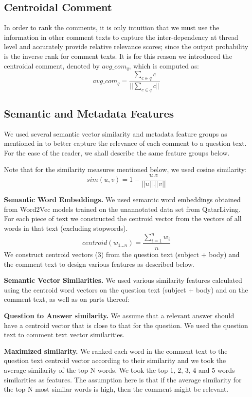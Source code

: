 \documentclass[12pt, a4paper, oneside]{Thesis} %
\begin{document}
\subsection{Centroidal Comment}
\label{subsection:centroidal-comment}

In order to rank the comments, it is only intuition that we must use the information in other comment texts to capture the inter-dependency at thread level and accurately provide relative relevance scores; since the output probability is the inverse rank for comment texts. It is for this reason we introduced the centroidal comment, denoted by $avg\_com_q$, which is computed as:
\[ avg\_com_q = \frac{\sum\limits_{c \in q} c}{||\sum\limits_{c \in q} c||} \tag{1} \label{equation:1} \]

\subsection{Semantic and Metadata Features}
\label{subsection:extra-feat}
We used several semantic vector similarity and metadata feature groups as mentioned in \cite{mihaylov2016semanticz} to better capture the relevance of each comment to a question text. For the ease of the reader, we shall describe the same feature groups below. 

Note that for the similarity measures mentioned below, we used cosine similarity:
\[ sim(u, v) = 1 - \frac{u.v}{||u||.||v||} \tag{2} \label{equation:2} \]

\textbf{Semantic Word Embeddings.} We used semantic word embeddings obtained from Word2Vec models trained on the unannotated data set from QatarLiving. For each piece of text we constructed the centroid vector from the vectors of all words in that text (excluding stopwords).
\[ centroid(w_{1...n}) = \frac{\sum\limits_{i=1}^{n} w_i}{n} \tag{3} \label{equation:3} \]
We construct centroid vectors (3) from the question text (subject + body) and the comment text to design various features as described below.

\textbf{Semantic Vector Similarities.} We used various similarity features calculated using the centroid word vectors on the question text (subject + body) and on the comment text, as well as on parts thereof:

\textbf{Question to Answer similarity.} We assume that a relevant answer should have a centroid vector that is close to that for the question. We used the question text to comment text vector similarities.

\textbf{Maximized similarity.} We ranked each word in the comment text to the question text centroid vector according to their similarity and we took the average similarity of the top N words. We took the top 1, 2, 3, 4 and 5 words similarities as features. The assumption here is that if the average similarity for the top N most similar words is high, then the comment might be relevant.
\end{document}
